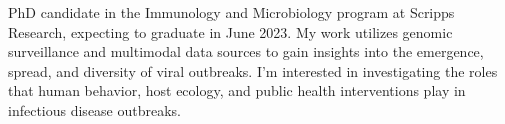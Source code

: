 
\begin{cvparagraph}

    PhD candidate in the Immunology and Microbiology program at Scripps Research, expecting to graduate in June 2023.
    My work utilizes genomic surveillance and multimodal data sources to gain insights into the emergence, spread, and diversity of viral outbreaks.
    I'm interested in investigating the roles that human behavior, host ecology, and public health interventions play in infectious disease outbreaks.
\end{cvparagraph}